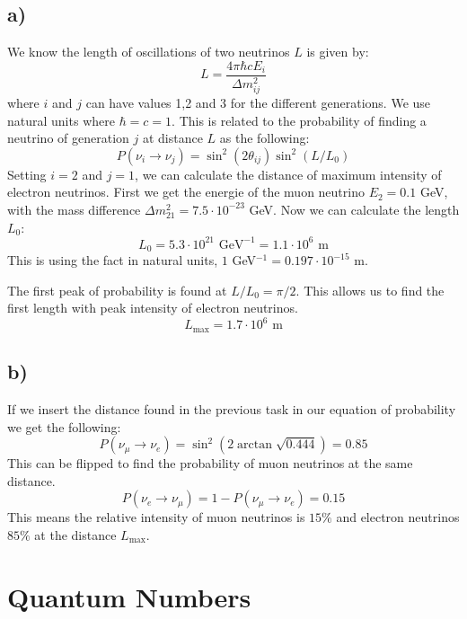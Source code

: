 \documentclass{article}
\begin{document}
\subsection*{a)}
We know the length of oscillations of two neutrinos $L$ is given by:
\begin{equation}
    L = \frac{4πℏcE_i}{Δm_{ij}^2}
\end{equation}
where $i$ and $j$ can have values 1,2 and 3 for the different generations. We use natural units where $ℏ = c = 1$. This is related to the probability of finding a neutrino of generation $j$ at distance $L$ as the following:
\begin{equation}
  P(ν_i → ν_j) = \sin ^2(2θ_{ij}) \sin ^2(L / L_0)
\end{equation}
Setting $i = 2$ and $j = 1$, we can calculate the distance of maximum intensity of electron neutrinos. First we get the energie of the muon neutrino $E_2 = 0.1$ GeV, with the mass difference $Δm_{21}^2 = 7.5 ⋅ 10^{-23}$ GeV. Now we can calculate the length $L_0$:
\begin{equation}
  L_0 = 5.3 ⋅ 10^{21} \text{ GeV}^{-1} = 1.1 ⋅ 10^{6} \text{ m}
\end{equation}
This is using the fact in natural units, $1$ GeV$^{-1}$$ = 0.197 ⋅ 10^{-15}$ m. 

The first peak of probability is found at $L / L_0 = π / 2$. This allows us to find the first length with peak intensity of electron neutrinos.
\begin{equation}
  L_{\text{max}} = 1.7 ⋅ 10^{6} \text{ m}
\end{equation} 

\subsection*{b)}
If we insert the distance found in the previous task in our equation of probability we get the following:
\begin{equation}
  P(ν_{μ} → ν_{e}) = \sin ^2 (2 \arctan \sqrt{0.444}) = 0.85
\end{equation}
This can be flipped to find the probability of muon neutrinos at the same distance.
\begin{equation}
  P(ν_{e} → ν_{μ}) = 1 - P(ν_{μ} → ν_{e}) = 0.15
\end{equation}
This means the relative intensity of muon neutrinos is $15 \%$ and electron neutrinos $85 \%$ at the distance $L_{\text{max}}$.


\section{Quantum Numbers}
\end{document}
